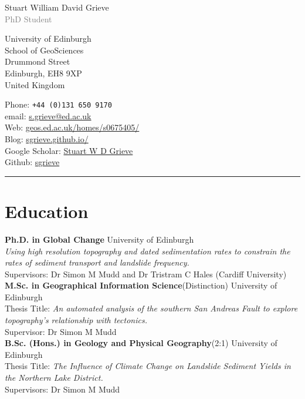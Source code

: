 \documentclass[10pt, a4paper]{article}
\newcommand{\years}[1]{\marginnote{\scriptsize #1}}
\begin{document}
{\LARGE Stuart William David Grieve}\\
\textcolor{Gray}{\large{PhD Student}}\\[0.1cm]

\begin{multicols}{2}
University of Edinburgh\\
School of GeoSciences\\
Drummond Street\\
Edinburgh, EH8 9XP\\
United Kingdom

\columnbreak

Phone: \texttt{+44~(0)131~650~9170}\\
email: \href{mailto:s.grieve@ed.ac.uk}{s.grieve@ed.ac.uk}\\
Web: \href{http://www.geos.ed.ac.uk/homes/s0675405/}{geos.ed.ac.uk/homes/s0675405/}\\
Blog: \href{http://sgrieve.github.io/}{sgrieve.github.io/}\\
Google Scholar: \href{https://scholar.google.co.uk/citations?user=VwQbAzQAAAAJ&hl=en}{Stuart W D Grieve}\\
Github: \href{https://github.com/sgrieve}{sgrieve}

\end{multicols}

\hrule
\section*{Education}
\noindent
\years{2013--}\textbf{Ph.D. in Global Change} University of Edinburgh\\[0.05cm]
\textit{Using high resolution topography and dated sedimentation rates to constrain the rates of sediment transport and landslide frequency.}\\[0.05cm]
Supervisors: Dr Simon M Mudd and Dr Tristram C Hales (Cardiff University)\\

\years{2011--2012}\textbf{M.Sc. in Geographical Information Science}(Distinction) University of Edinburgh\\[0.05cm]
Thesis Title: \textit{An automated analysis of the southern San Andreas Fault to explore topography’s relationship with tectonics.}\\[0.05cm]
Supervisor: Dr Simon M Mudd\\

\years{2007--2011}\textbf{B.Sc. (Hons.) in Geology and Physical Geography}(2:1) University of Edinburgh\\[0.05cm]
Thesis Title: \textit{The Influence of Climate Change on Landslide Sediment Yields in the Northern Lake District.}\\[0.05cm]
Supervisors: Dr Simon M Mudd\\
\end{document}
